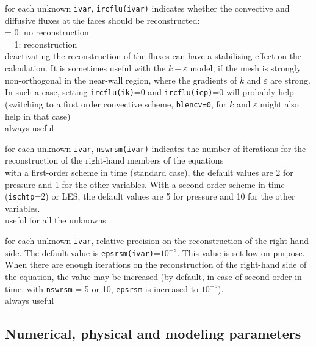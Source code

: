 {for each unknown {\tt ivar}, {\tt ircflu(ivar)} indicates whether the convective
and diffusive fluxes at the faces should be reconstructed: \\
\hspace*{1.3cm}= 0: no reconstruction\\
\hspace*{1.3cm}= 1: reconstruction\\
deactivating the reconstruction of the fluxes can have a stabilising effect on
the calculation. It is sometimes useful with the $k-\varepsilon$ model, if the
mesh is strongly non-orthogonal in the near-wall region, where the gradients of
$k$ and $\varepsilon$ are strong. In such a case, setting {\tt ircflu(ik)}=0
and {\tt ircflu(iep)}=0 will probably help (switching to a first order
convective scheme, {\tt blencv=0}, for $k$ and $\varepsilon$ might also help in
that case)\\
always useful}

{for each unknown {\tt ivar}, {\tt nswrsm(ivar)} indicates the number of iterations for the
reconstruction of the right-hand members of the equations\\
with a first-order scheme in time
(standard case), the default values are 2 for pressure and 1 for the
other variables. With a second-order scheme in time ({\tt ischtp}=2) or LES, the
default values are 5 for pressure and 10 for the other variables.\\
useful for all the unknowns}

{for each unknown {\tt ivar}, relative precision on the reconstruction of the
right hand-side. The default value is {\tt epsrsm(ivar)}=$10^{-8}$. This value is set low
on purpose. When there are enough iterations on the reconstruction of the
right-hand side of the equation,
the value may be increased (by default, in case of second-order in time,
with {\tt nswrsm} = 5 or 10, {\tt epsrsm} is increased to $10^{-5}$).\\
always useful}


\subsection{Numerical, physical and modeling parameters}
